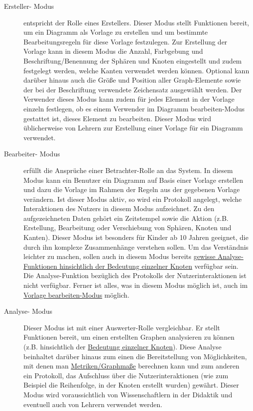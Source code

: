 \documentclass[enabledeprecatedfontcommands,fontsize=11pt,paper=a4,twoside]{scrartcl}
\newcounter{one}
\begin{document}
\begin{description}
	\item[Ersteller- Modus] entspricht der Rolle eines Erstellers. Dieser Modus stellt Funktionen bereit, um ein Diagramm als Vorlage zu erstellen und um bestimmte Bearbeitungsregeln für diese Vorlage festzulegen. Zur Erstellung der Vorlage kann in diesem Modus die Anzahl, Farbgebung und Beschriftung/Benennung der Sphären und Knoten eingestellt und zudem festgelegt werden, welche Kanten verwendet werden können. Optional kann darüber hinaus auch die Größe und Position aller Graph-Elemente sowie der bei der Beschriftung verwendete Zeichensatz ausgewählt werden. Der Verwender dieses Modus kann zudem für jedes Element in der Vorlage einzeln festlegen, ob es einem Verwender im \glqq Diagramm bearbeiten\grqq-Modus gestattet ist, dieses Element zu bearbeiten. Dieser Modus wird üblicherweise von Lehrern zur Erstellung einer Vorlage für ein Diagramm verwendet.
	\item[Bearbeiter- Modus] erfüllt die Ansprüche einer Betrachter-Rolle an das System. In diesem Modus kann ein Benutzer ein Diagramm auf Basis einer Vorlage erstellen und dazu die Vorlage im Rahmen der Regeln aus der gegebenen Vorlage verändern. Ist dieser Modus aktiv, so wird ein Protokoll angelegt, welche Interaktionen des Nutzers in diesem Modus aufzeichnet. Zu den aufgezeichneten Daten gehört ein Zeitstempel sowie die Aktion (z.B. Erstellung, Bearbeitung oder Verschiebung von Sphären, Knoten und Kanten). Dieser Modus ist besonders für Kinder ab 10 Jahren geeignet, die durch ihn komplexe Zusammenhänge verstehen sollen. Um das Verständnis leichter zu machen, sollen auch in diesem Modus bereits \hyperlink{Bedeutung eines Knoten}{gewisse Analyse-Funktionen hinsichtlich der Bedeutung einzelner Knoten} verfügbar sein. Die Analyse-Funktion bezüglich des Protokolls der Nutzerinteraktionen ist nicht verfügbar. Ferner ist alles, was in diesem Modus möglich ist, auch im \hyperlink{``Vorlage bearbeiten''-Modus}{\glqq Vorlage bearbeiten\grqq -Modus} möglich.
	\item[Analyse- Modus] Dieser Modus ist mit einer Auswerter-Rolle vergleichbar. Er stellt Funktionen bereit, um einen erstellten Graphen analysieren zu können (z.B. hinsichtlich der \hyperlink{Bedeutung eines Knoten}{Bedeutung einzelner Knoten}). Diese Analyse beinhaltet darüber hinaus zum einen die Bereitstellung von Möglichkeiten, mit denen man \hyperlink{Metriken}{Metriken/Graphmaße} berechnen kann und zum anderen ein Protokoll, das Aufschluss über die Nutzerinteraktionen (wie zum Beispiel die Reihenfolge, in der Knoten erstellt wurden) gewährt. Dieser Modus wird voraussichtlich von Wissenschaftlern in der Didaktik und eventuell auch von Lehrern verwendet werden.

\end{description}
\end{document}
